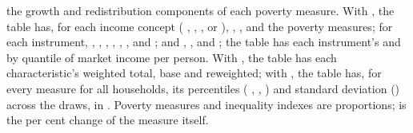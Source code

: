 the growth and redistribution components of each poverty measure. With
, the table  has, for each income concept
( , , ,
 or ), , ,  and the
poverty measures; for each instrument, , ,
, , , , 
and ; and , ,  and ; the table
 has each instrument's  and  by
quantile of market income per person. With , the table
 has each characteristic's weighted total, base and
reweighted; with , the table  has, for every measure
for all households, its percentiles ( , ,
) and standard deviation () across the draws, in
. Poverty measures and inequality indexes are
proportions;  is the per cent change of the measure itself.


